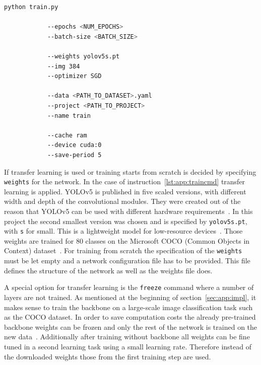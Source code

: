 \renewcommand{\lstlistingname}{Instruction}
\begin{minipage}{\linewidth}
	\vspace*{0.5cm}
	\begin{lstlisting}[language=Bash, keywordstyle=\color{black}, 
		caption=General command to start the training of YOLOv5., label=lst:app:traincmd]
		python train.py
		
			--epochs <NUM_EPOCHS>
			--batch-size <BATCH_SIZE>
			
			--weights yolov5s.pt
			--img 384
			--optimizer SGD
			
			--data <PATH_TO_DATASET>.yaml
			--project <PATH_TO_PROJECT>
			--name train
			
			--cache ram
			--device cuda:0
			--save-period 5
	\end{lstlisting}
\end{minipage}

If transfer learning is used or training starts from scratch is decided by specifying \texttt{weights} 
for the network. In the case of instruction~\ref{lst:app:traincmd} transfer learning is applied. YOLOv5 
is published in five scaled versions, with different width and depth of the convolutional modules. 
They were created out of the reason that YOLOv5 can be used with different hardware 
requirements~\cite{jocher2020, terven2023}. In this project the second smallest version was chosen 
and is specified by \texttt{yolov5s.pt}, with \texttt{s} for small. This is a lightweight model for 
low-resource devices~\cite{terven2023}. Those weights are trained for 80 classes on the Microsoft 
COCO (Common Objects in Context) dataset~\cite{lin2014, jocher2020}. For training from scratch 
the specification of the \texttt{weights} must be let empty and a network configuration file has to be 
provided. This file defines the structure of the network as well as the weights file does.

A special option for transfer learning is the \texttt{freeze} command where a number of 
layers are not trained. As mentioned at the beginning of section~\ref{sec:app:impl}, it makes sense 
to train the backbone on a large-scale image classification task such as the COCO dataset. In order 
to save computation costs the already pre-trained backbone weights can be frozen and only the rest 
of the network is trained on the new data~\cite{y5TransfLearn}. Additionally after training without 
backbone all weights can be fine tuned in a second learning task using a small learning rate. 
Therefore instead of the downloaded weights those from the first training step are used.

